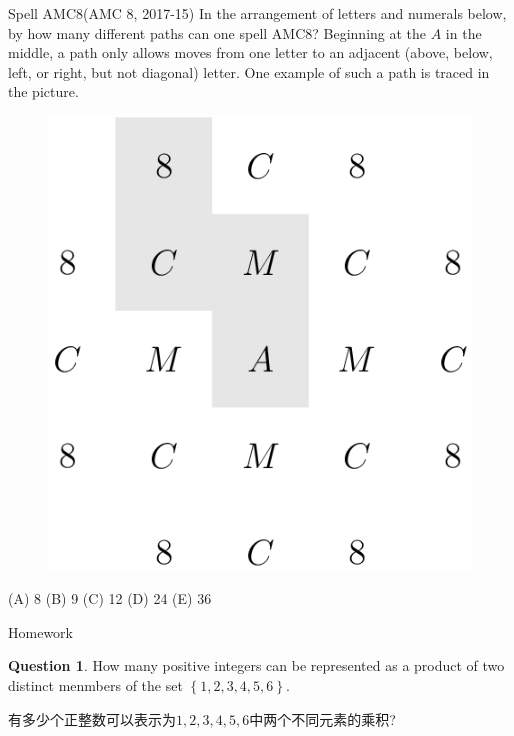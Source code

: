 \documentclass{beamer}
\theoremstyle{definition}
\newtheorem{ques}[defn]{Question}
\newcommand{\bbrace}[1]{\left\{ #1 \right\} }
\begin{document}
\begin{frame}{Spell AMC8(AMC 8, 2017-15)}
        In the arrangement of letters and numerals below, by how many different paths can one spell AMC8? Beginning at the $A$ in the middle, a path only allows moves from one letter to an adjacent (above, below, left, or right, but not diagonal) letter. One example of such a path is traced in the picture. 
        \begin{figure}
            \includegraphics[height=0.3\textheight]{amc8spell.png}
        \end{figure}
        (A) 8 (B) 9 (C) 12 (D) 24 (E) 36
\end{frame}
\begin{frame}{Homework}
    \begin{ques}
        How many positive integers can be represented as a product of two distinct menmbers of the set $\bbrace{1,2,3,4,5,6}$.

        有多少个正整数可以表示为$1,2,3,4,5,6$中两个不同元素的乘积?
    \end{ques}
\end{frame}
\end{document}

